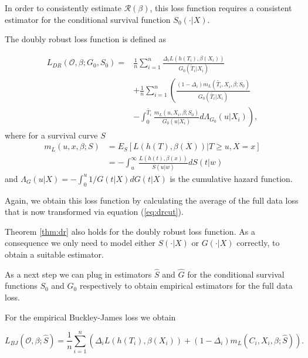 \documentclass[12pt, a4paper]{scrartcl}
\theoremstyle{definition}
\theoremstyle{plain}
\numberwithin{equation}{section}
\numberwithin{figure}{section}
\numberwithin{table}{section}
\begin{document}
	In order to consistently estimate $\mathcal{R}(\beta)$, this loss function requires a consistent estimator for the conditional survival function $S_0(\cdot\vert X)$.
	
	The doubly robust loss function is defined as
	
	
	\begin{equation}\label{eq:dr}
	\begin{split}
		L_{DR}(\mathcal{O}, \beta; G_0, S_0) = & \frac{1}{n} \sum_{i=1}^n \frac{\Delta_i L(h(T_i),\beta(X_i))}{G_0(\tilde{T}_i\vert X_i)}\\
		~ & + \frac{1}{n} \sum_{i=1}^n \left(\frac{(1-\Delta_i)m_L(\tilde{T_i}, X_i, \beta; S_0)}{G_0(\tilde{T_i}\vert X_i)} \right.\\
		& - \left. \int _0^{\tilde{T_i}} \frac{m_L(u, X_i, \beta; S_0)}{G_0(u \vert X_i)} d \Lambda_{G_0}(u \vert X_i) \right),
	\end{split}
	\end{equation}
	where for a survival curve $S$
	\begin{equation}\label{eq:exploss}
	\begin{split}
		m_L(u,x,\beta; S) &= E_S[L(h(T), \beta(X)) \vert T \geq u, X = x]\\
		&= - \int_u^{\infty} \frac{L(h(t), \beta(x))}{S(u \vert w)} dS(t\vert w)
	\end{split}
	\end{equation}
	and $\Lambda_G(u\vert X) = - \int_0^u  1/ G(t\vert X)dG(t \vert X)$ is the cumulative hazard function.
	
	Again, we obtain this loss function by calculating the average of the full data loss that is now transformed via equation (\ref{eq:drcut}).
	
	Theorem \ref{thm:dr} also holds for the doubly robust loss function.
	As a consequence we only need to model either $S(\cdot\vert X)$ or $G(\cdot\vert X)$ correctly, to obtain a suitable estimator.
	
	As a next step we can plug in estimators $\hat{S}$ and $\hat{G}$ for the conditional survival functions $S_0$ and $G_0$ respectively to obtain empirical estimators for the full data loss.
	
	For the empirical Buckley-James loss we obtain
	
	\begin{equation*}
	L_{BJ}(\mathcal{O}, \beta; \hat{S}) = \frac{1}{n} \sum_{i=1}^n \left( \Delta_i L(h(T_i), \beta(X_i))+(1-\Delta_i)m_L(C_i, X_i, \beta; \hat{S})\right).
	\end{equation*}
	
\end{document}
